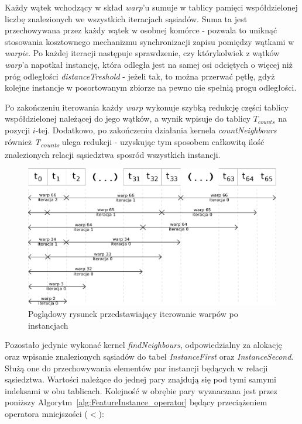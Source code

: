 \documentclass[12pt]{article}
\begin{document}
Każdy wątek wchodzący w skład \textit{warp}'u sumuje w tablicy pamięci współdzielonej liczbę znalezionych we wszystkich iteracjach sąsiadów. Suma ta jest przechowywana przez każdy wątek w osobnej komórce - pozwala to uniknąć stosowania kosztownego mechanizmu synchronizacji zapisu pomiędzy wątkami w \textit{warpie}. Po każdej iteracji następuje sprawdzenie, czy którykolwiek z wątków \textit{warp}'a napotkał instancję, która odległa jest na samej osi odciętych o więcej niż próg odległości \textit{distanceTreshold} - jeżeli tak, to można przerwać pętlę, gdyż kolejne instancje w posortowanym zbiorze na pewno nie spełnią progu odległości.

Po zakończeniu iterowania każdy \textit{warp} wykonuje szybką redukcję części tablicy współdzielonej należącej do jego wątków, a wynik wpisuje do tablicy \textit{$ T_{counts} $} na pozycji $i$-tej. Dodatkowo, po zakończeniu działania kernela  \textit{countNeighbours} również \textit{T\textsubscript{counts}} ulega redukcji - uzyskując tym sposobem całkowitą ilość znalezionych relacji sąsiedztwa sposród wszystkich instancji.


\begin{figure}[H]
\centering
\includegraphics[width=\textwidth]{planesweep.eps}
\caption{Poglądowy rysunek przedstawiający iterowanie warpów po instancjach}
\end{figure}

Pozostało jedynie wykonać kernel \textit{findNeighbours}, odpowiedzialny za alokację oraz wpisanie znalezionych sąsiadów do tabel \textit{InstanceFirst} oraz \textit{InstanceSecond}. Służą one do przechowywania elementów par instancji będących w relacji sąsiedztwa. Wartości należące do jednej pary znajdują się pod tymi samymi indeksami w obu tablicach. Kolejność w obrębie pary wyznaczana jest przez poniższy Algorytm~\ref{alg:FeatureInstance_operator} będący przeciążeniem operatora mniejszości ($ < $):
\end{document}

